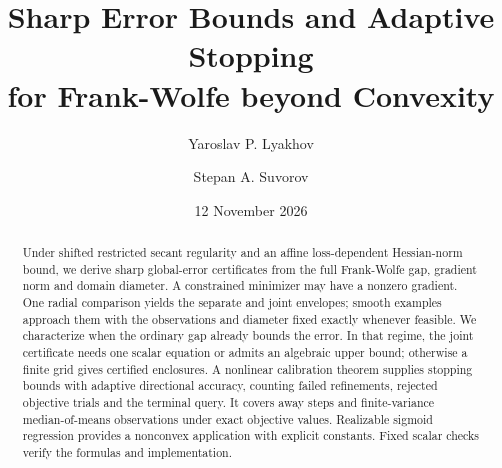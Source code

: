 \documentclass[a4paper,11pt]{article}
\title{Sharp Error Bounds and Adaptive Stopping\\for Frank-Wolfe beyond Convexity}
\author{Yaroslav P. Lyakhov \and Stepan A. Suvorov}
\date{12 November 2026}
\begin{document}
\maketitle
\begin{abstract}
Under shifted restricted secant regularity and an affine loss-dependent
Hessian-norm bound, we derive sharp global-error certificates from the
full Frank-Wolfe gap, gradient norm and domain diameter. A constrained
minimizer may have a nonzero gradient. One radial comparison yields
the separate and joint envelopes; smooth examples approach them with
the observations and diameter fixed exactly whenever feasible. We characterize when the
ordinary gap already bounds the error. In that regime, the joint
certificate needs one scalar equation or admits an algebraic upper
bound; otherwise a finite grid gives certified enclosures. A nonlinear
calibration theorem supplies stopping bounds with adaptive directional
accuracy, counting failed refinements, rejected objective trials and
the terminal query. It covers away steps and finite-variance
median-of-means observations under exact objective values. Realizable
sigmoid regression provides a nonconvex application with explicit
constants. Fixed scalar checks verify the formulas and implementation.
\end{abstract}













\end{document}
